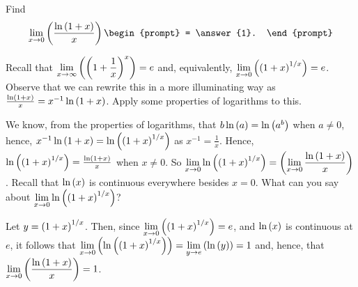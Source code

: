 \documentclass{ximera}
\author{Gregory Hartman \and Matthew Carr}
\begin{document}
\begin{exercise}




Find 
\[
\lim_{x\to0}\p{\frac{\ln\p{1+x}}{x}}
\begin{prompt}
= \answer{1}.
\end{prompt}
\]

\begin{hint}
Recall that $\lim_{x\to\infty}\p{\p{1+\frac{1}{x}}^{x}}=e$ and, equivalently, $\lim_{x\to0}\p{\p{1+x}^{1/x}}=e$. Observe that we can rewrite this in a more illuminating way as $\frac{\ln\left(1+x\right)}{x}=x^{-1}\ln\left(1+x\right)$. Apply some properties of logarithms to this.
\end{hint}
\begin{hint}
We know, from the properties of logarithms, that $b\ln\left(a\right)=\ln\left(a^b\right)$ when $a\ne0$, hence, $x^{-1}\ln\left(1+x\right)=\ln\left(\left(1+x\right)^{1/x}\right)$ as $x^{-1}=\frac{1}{x}$. Hence, $\ln\left(\left(1+x\right)^{1/x}\right)=\frac{\ln\left(1+x\right)}{x}$ when $x\ne0$. So $\lim_{x\to0}\ln\p{\p{1+x}^{1/x}}=\p{\lim_{x\to0}\frac{\ln\p{1+x}}{x}}$. Recall that $\ln\left(x\right)$ is continuous everywhere besides $x=0$. What can you say about $\lim_{x\to0}\ln\p{\p{1+x}^{1/x}}$?
\end{hint}
\begin{hint}
Let $y=\left(1+x\right)^{1/x}$. Then, since $\lim_{x\to0}\p{\p{1+x}^{1/x}}=e$, and $\ln\left(x\right)$ is continuous at $e$, it follows that $\lim_{x\to0}\p{\ln\p{\p{1+x}^{1/x}}}=\lim_{y\to e}\p{\ln\p{y}}=1$ and, hence, that $\lim_{x\to0}\p{\frac{\ln\p{1+x}}{x}}=1$.
\end{hint}
\end{exercise}
\end{document}
